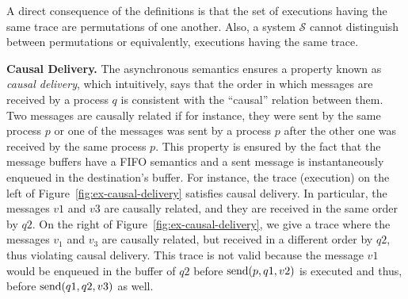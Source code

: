 A direct consequence of the definitions is that the set of executions having the same trace are permutations of one another. Also, a system $\mathcal{S}$ cannot distinguish between permutations or equivalently, executions having the same trace.




%

\smallskip
\noindent
{\bf Causal Delivery.}
The asynchronous semantics ensures a property known as \emph{causal delivery}, which intuitively, says that the order in which messages are received by a process $q$ is consistent with the ``causal'' relation between them. Two messages are causally related if for instance, they were sent by the same process $p$ or one of the messages was sent by a process $p$ after the other one was received by the same process $p$. This property is ensured by the fact that the message buffers have a FIFO semantics and a sent message is instantaneously enqueued in the destination's buffer. For instance, the trace (execution) on the left of Figure~\ref{fig:ex-causal-delivery} satisfies causal delivery. In particular, the messages $v1$ and $v3$ are causally related, and they are received in the same order by $q2$. On the right of Figure~\ref{fig:ex-causal-delivery}, we give a trace where the messages $v_1$ and $v_3$ are causally related, but received in a different order by $q2$, thus violating causal delivery. 
This trace is not valid because the message $v1$ would be enqueued in the buffer of $q2$ before $\mathrm{send}({p,q1,v2})$ is executed and thus, before $\mathrm{send}({q1,q2,v3})$ as well.


